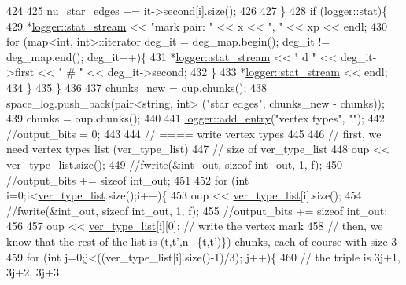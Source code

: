 \begin{DoxyCode}
424 
425       nu\_star\_edges += it->second[i].size();
426       
427     \}
428     \textcolor{keywordflow}{if} (\hyperlink{classlogger_a26812b5ba03f130e8dae3446d5fc032f}{logger::stat})\{
429       *\hyperlink{classlogger_a7db37821f875f2ba3540980b355779f5}{logger::stat\_stream} << \textcolor{stringliteral}{"mark pair: "} <<  x << \textcolor{stringliteral}{", "} << xp << endl;
430       \textcolor{keywordflow}{for} (map<int, int>::iterator deg\_it = deg\_map.begin(); deg\_it != deg\_map.end(); deg\_it++)\{
431         *\hyperlink{classlogger_a7db37821f875f2ba3540980b355779f5}{logger::stat\_stream} << \textcolor{stringliteral}{" d "} << deg\_it->first << \textcolor{stringliteral}{" # "} << deg\_it->second;
432       \}
433       *\hyperlink{classlogger_a7db37821f875f2ba3540980b355779f5}{logger::stat\_stream} << endl;
434     \}
435   \}
436   
437   chunks\_new = oup.chunks();
438   space\_log.push\_back(pair<string, int> (\textcolor{stringliteral}{"star edges"}, chunks\_new - chunks));
439   chunks = oup.chunks();
440 
441   \hyperlink{classlogger_a710163deb17bc81f70d53d285b8ac9ac}{logger::add\_entry}(\textcolor{stringliteral}{"vertex types"}, \textcolor{stringliteral}{""});
442   \textcolor{comment}{//output\_bits = 0;}
443   
444   \textcolor{comment}{// ==== write vertex types}
445 
446   \textcolor{comment}{// first, we need vertex types list (ver\_type\_list)}
447   \textcolor{comment}{// size of ver\_type\_list}
448   oup <<  \hyperlink{classmarked__graph__compressed_af2e3e55223d436628a02758dfae88493}{ver\_type\_list}.size();
449   \textcolor{comment}{//fwrite(&int\_out, sizeof int\_out, 1, f);}
450   \textcolor{comment}{//output\_bits += sizeof int\_out;}
451 
452   \textcolor{keywordflow}{for} (\textcolor{keywordtype}{int} i=0;i<\hyperlink{classmarked__graph__compressed_af2e3e55223d436628a02758dfae88493}{ver\_type\_list}.size();i++)\{
453     oup << \hyperlink{classmarked__graph__compressed_af2e3e55223d436628a02758dfae88493}{ver\_type\_list}[i].size();
454     \textcolor{comment}{//fwrite(&int\_out, sizeof int\_out, 1, f);}
455     \textcolor{comment}{//output\_bits += sizeof int\_out;}
456 
457     oup << \hyperlink{classmarked__graph__compressed_af2e3e55223d436628a02758dfae88493}{ver\_type\_list}[i][0]; \textcolor{comment}{// write the vertex mark}
458     \textcolor{comment}{// then, we know that the rest of the list is (t,t',n\_\{t,t')\}) chunks, each of course with size 3}
459     \textcolor{keywordflow}{for} (\textcolor{keywordtype}{int} j=0;j<((ver\_type\_list[i].size()-1)/3); j++)\{
460       \textcolor{comment}{// the triple is 3j+1, 3j+2, 3j+3}

\end{DoxyCode}
